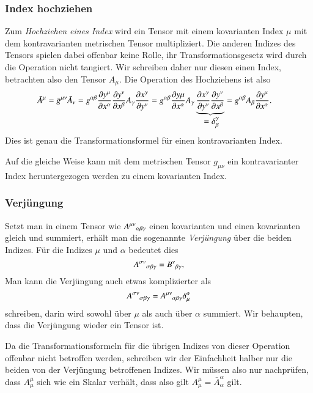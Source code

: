 \subsubsection{Index hochziehen}
Zum {\em Hochziehen eines Index} wird ein Tensor mit einem kovarianten
Index $\mu$ mit dem kontravarianten metrischen Tensor multipliziert.
%
%
Die anderen Indizes des Tensors spielen dabei offenbar keine Rolle,
ihr Transformationsgesetz wird durch die Operation nicht tangiert.
Wir schreiben daher nur diesen einen Index, betrachten also den Tensor
$A_\mu$.
Die Operation des Hochziehens ist also
\begin{align*}
\bar A^\mu
=
\bar g^{\mu\nu}\bar A_\nu
&=
g^{\alpha\beta}
\frac{\partial y^\mu}{\partial x^\alpha}
\frac{\partial y^\nu}{\partial x^\beta}
A_\gamma
\frac{\partial x^\gamma}{\partial y^\nu}
=
g^{\alpha\beta}
\frac{\partial y\mu}{\partial x^\alpha}
A_\gamma
\underbrace{
\frac{\partial x^\gamma}{\partial y^\nu}
\frac{\partial y^\nu}{\partial x^\beta}
}_{\displaystyle \mathstrut= \delta^\gamma_\beta}
=
g^{\alpha\beta}
A_\beta
\frac{\partial y^\mu}{\partial x^\alpha}.
\end{align*}
Dies ist genau die Transformationsformel für einen kontravarianten Index.

Auf die gleiche Weise kann mit dem metrischen Tensor $g_{\mu\nu}$ ein
kontravarianter Index heruntergezogen werden zu einem kovarianten Index.
%
%

\subsubsection{Verjüngung}
Setzt man in einem Tensor wie $A^{\mu\nu}\mathstrut_{\alpha\beta\gamma}$
einen kovarianten und einen kovarianten gleich und summiert,
erhält man die sogenannte {\em Verjüngung} über die beiden Indizes.
%
Für die Indizes $\mu$ und $\alpha$ bedeutet dies
\[
A^{\sigma\nu}\mathstrut_{\sigma\beta\gamma}
=
B^\nu\mathstrut_{\beta\gamma},
\]
Man kann die Verjüngung auch etwas komplizierter als
\begin{equation}
A^{\sigma\nu}\mathstrut_{\sigma\beta\gamma}
=
A^{\mu\nu}\mathstrut_{\alpha\beta\gamma}\delta^\alpha_\mu
\label{skript:trafo:verjung}
\end{equation}
schreiben, darin wird sowohl über $\mu$ als auch über $\alpha$
summiert.
Wir behaupten, dass die Verjüngung wieder ein Tensor ist.

Da die Transformationsformeln für die übrigen Indizes von dieser
Operation offenbar nicht betroffen werden, schreiben wir der Einfachheit
halber nur die beiden von der Verjüngung betroffenen Indizes.
Wir müssen also nur nachprüfen, dass $A^\mu_\mu$ sich wie ein Skalar
verhält, dass also gilt $A^\mu_\mu=\bar A^\alpha_\alpha$ gilt.

